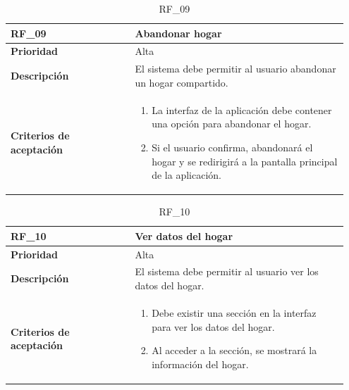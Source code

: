 \begin{table}[htb!]
    \begin{tabular}{|p{0.35\linewidth}|p{0.6\linewidth}|}
        \hline
        \rowcolor[HTML]{C0C0C0}  
        \textbf{RF\_09} & \textbf{Abandonar hogar} \\
        \hline
        \textbf{Prioridad} & Alta \\
        \hline
        \textbf{Descripción} & El sistema debe permitir al usuario abandonar un hogar compartido.  \\
        \hline
        \vspace{0.5mm}
        \textbf{Criterios de aceptación} & 
        \begin{minipage}[t]{0.9\linewidth}
            \begin{enumerate}
                \item La interfaz de la aplicación debe contener una opción para abandonar el hogar.
                \item Si el usuario confirma, abandonará el hogar y se redirigirá a la pantalla principal de la aplicación.
            \end{enumerate}
            \vspace{2mm}
        \end{minipage} \\
        \hline
    \end{tabular}
    \caption{RF\_09}
    \label{req:RF09}

\end{table}

\begin{table}[htb!]
    \begin{tabular}{|p{0.35\linewidth}|p{0.6\linewidth}|}
        \hline
        \rowcolor[HTML]{C0C0C0}  
        \textbf{RF\_10} & \textbf{Ver datos del hogar} \\
        \hline
        \textbf{Prioridad} & Alta \\
        \hline
        \textbf{Descripción} & El sistema debe permitir al usuario ver los datos del hogar.  \\
        \hline
        \vspace{0.5mm}
        \textbf{Criterios de aceptación} & 
        \begin{minipage}[t]{0.9\linewidth}
            \begin{enumerate}
                \item Debe existir una sección en la interfaz para ver los datos del hogar.
                \item Al acceder a la sección, se mostrará la información del hogar.
            \end{enumerate}
            \vspace{2mm}
        \end{minipage} \\
        \hline
    \end{tabular}
    \caption{RF\_10}
    \label{req:RF10}
\end{table}

